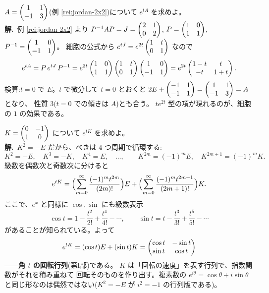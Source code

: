 \begin{rei}[例題・標準(ジョルダン標準形経由)]\label{rei:exp-jordan}
$A = \begin{pmatrix}1 & 1 \\ -1 & 3\end{pmatrix}$(例 \ref{rei:jordan-2x2})について
$e^{tA}$ を求めよ。\\
\textbf{解.}\ 例 \ref{rei:jordan-2x2} より
$P^{-1}AP = J = \begin{pmatrix}2 & 1 \\ 0 & 2\end{pmatrix}$,
$P = \begin{pmatrix}1 & 0 \\ 1 & 1\end{pmatrix}$, $P^{-1} = \begin{pmatrix}1 & 0 \\ -1 & 1\end{pmatrix}$。
細胞の公式から $e^{tJ} = e^{2t}\begin{pmatrix}1 & t \\ 0 & 1\end{pmatrix}$ なので
\[
e^{tA} = P\,e^{tJ}\,P^{-1}
= e^{2t}\begin{pmatrix}1 & 0 \\ 1 & 1\end{pmatrix}\begin{pmatrix}1 & t \\ 0 & 1\end{pmatrix}\begin{pmatrix}1 & 0 \\ -1 & 1\end{pmatrix}
= e^{2t}\begin{pmatrix}1 - t & t \\ -t & 1 + t\end{pmatrix}.
\]
検算:$t = 0$ で $E$。$t$ で微分して $t = 0$ とおくと
$2E + \begin{pmatrix}-1 & 1 \\ -1 & 1\end{pmatrix} = \begin{pmatrix}1 & 1 \\ -1 & 3\end{pmatrix} = A$ となり、
性質 3($t = 0$ での傾きは $A$)とも合う。
$te^{2t}$ 型の項が現れるのが、細胞の $1$ の効果である。
\end{rei}

\begin{rei}[例題・標準(回転の生成)]\label{rei:exp-rotation}
$K = \begin{pmatrix}0 & -1 \\ 1 & 0\end{pmatrix}$ について $e^{tK}$ を求めよ。\\
\textbf{解.}\ $K^2 = -E$ だから、べきは $4$ つ周期で循環する:
\[
K^2 = -E, \quad K^3 = -K, \quad K^4 = E, \quad \dots,
\qquad K^{2m} = (-1)^m E, \quad K^{2m+1} = (-1)^m K.
\]
級数を偶数次と奇数次に分けると
\[
e^{tK} = \Bigl(\sum_{m=0}^{\infty} \frac{(-1)^m t^{2m}}{(2m)!}\Bigr)E
+ \Bigl(\sum_{m=0}^{\infty} \frac{(-1)^m t^{2m+1}}{(2m+1)!}\Bigr)K.
\]
ここで、$e^x$ と同様に $\cos, \sin$ にも級数表示
\[
\cos t = 1 - \frac{t^2}{2!} + \frac{t^4}{4!} - \cdots, \qquad
\sin t = t - \frac{t^3}{3!} + \frac{t^5}{5!} - \cdots
\]
があることが知られている。よって
\[
e^{tK} = (\cos t)E + (\sin t)K = \begin{pmatrix}\cos t & -\sin t \\ \sin t & \cos t\end{pmatrix}
\]
――\textbf{角 $t$ の回転行列}(第I部)である。
$K$ は「回転の速度」を表す行列で、指数関数がそれを積み重ねて
回転そのものを作り出す。複素数の $e^{i\theta} = \cos\theta + i\sin\theta$
と同じ形なのは偶然ではない($K^2 = -E$ が $i^2 = -1$ の行列版である)。
\end{rei}

